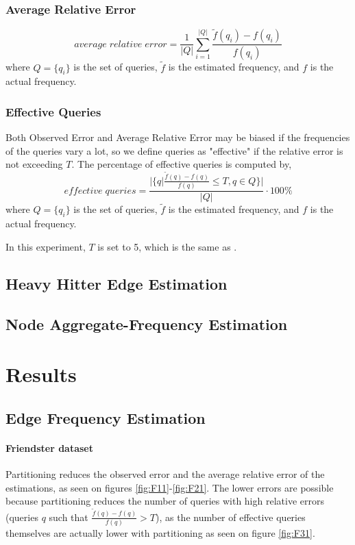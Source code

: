 \subsubsection{Average Relative Error \cite{DBLP}}
\[
average\;relative\;error = \frac{1}{|Q|} \sum_{i=1}^{|Q|} \frac{\tilde{f}(q_i)-f(q_i)}{f(q_i)}
\]
where $Q = \{q_i\}$ is the set of queries, $\tilde{f}$ is the estimated frequency, and $f$ is the actual frequency.

\subsubsection{Effective Queries \cite{DBLP}}
Both Observed Error and Average Relative Error may be biased if the frequencies of the queries vary a lot, so we define queries as "effective" if the relative error is not exceeding $T$. The percentage of effective queries is computed by,
\[
effective\;queries = \frac{|\{q|\frac{\tilde{f}(q)-f(q)}{f(q)} \leq T, q \in Q\}|}{|Q|} \cdot 100\%
\]
where $Q = \{q_i\}$ is the set of queries, $\tilde{f}$ is the estimated frequency, and $f$ is the actual frequency.

In this experiment, $T$ is set to 5, which is the same as \cite{DBLP}.

\subsection{Heavy Hitter Edge Estimation}

\subsection{Node Aggregate-Frequency Estimation}


\clearpage
\section{Results}

\subsection{Edge Frequency Estimation}

\paragraph{Friendster dataset}
Partitioning reduces the observed error and the average relative error of the estimations, as seen on figures \ref{fig:F11}-\ref{fig:F21}. The lower errors are possible because partitioning reduces the number of queries with high relative errors (queries $q$ such that $\frac{\tilde{f}(q)-f(q)}{f(q)} > T$), as the number of effective queries themselves are actually lower with partitioning as seen on figure \ref{fig:F31}.

